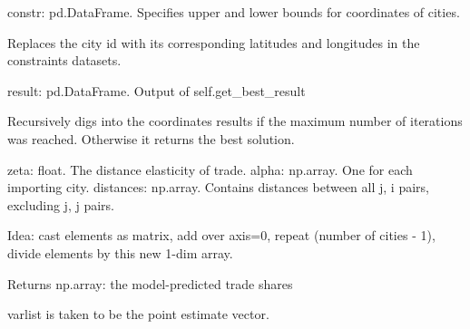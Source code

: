 \documentclass[letterpaper,10pt,english]{sphinxmanual}
\begin{document}
\begin{fulllineitems}

\begin{fulllineitems}
\label{\detokenize{index:estimate.Estimate.replace_id_coord}}
constr: pd.DataFrame. Specifies upper and lower bounds for
coordinates of cities.

Replaces the city id with its corresponding latitudes and longitudes in
the constraints datasets.

\end{fulllineitems}


\begin{fulllineitems}
\label{\detokenize{index:estimate.Estimate.resolve}}
result: pd.DataFrame. Output of self.get\_best\_result

Recursively digs into the coordinates results if the maximum number of
iterations was reached. Otherwise it returns the best solution.

\end{fulllineitems}


\begin{fulllineitems}
\label{\detokenize{index:estimate.Estimate.s_ij_model}}
zeta: float. The distance elasticity of trade.
alpha: np.array. One for each importing city.
distances: np.array. Contains distances between all j, i pairs,
excluding j, j pairs.

Idea: cast elements as matrix, add over axis=0,
repeat (number of cities - 1), divide elements by this new 1-dim array.

Returns np.array: the model-predicted trade shares

\end{fulllineitems}


\begin{fulllineitems}
\label{\detokenize{index:estimate.Estimate.simulate_contour_data}}
varlist is taken to be the point estimate vector.


\end{fulllineitems}
\end{fulllineitems}
\end{document}
